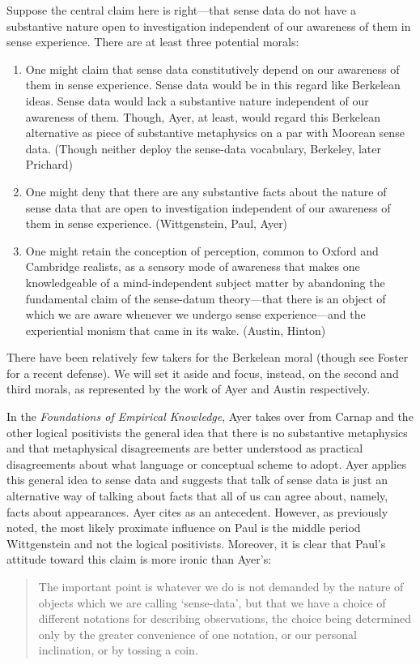 \documentclass[11pt]{article}
\begin{document}
Suppose the central claim here is right---that sense data do not have a substantive nature open to investigation independent of our awareness of them in sense experience. There are at least three potential morals:

\begin{enumerate}
	\item One might claim that sense data constitutively depend on our awareness of them in sense experience. Sense data would be in this regard like Berkelean ideas. Sense data would lack a substantive nature independent of our awareness of them. Though, Ayer, at least, would regard this Berkelean alternative as piece of substantive metaphysics on a par with Moorean sense data. (Though neither deploy the sense-data vocabulary, Berkeley, later Prichard)
	\item One might deny that there are any substantive facts about the nature of sense data that are open to investigation independent of our awareness of them in sense experience. (Wittgenstein, Paul, Ayer)
	\item One might retain the conception of perception, common to Oxford and Cambridge realists, as a sensory mode of awareness that makes one knowledgeable of a mind-independent subject matter by abandoning the fundamental claim of the sense-datum theory---that there is an object of which we are aware whenever we undergo sense experience---and the experiential monism that came in its wake. (Austin, Hinton)
\end{enumerate}

There have been relatively few takers for the Berkelean moral (though see Foster \citeyear{Foster:00ny} for a recent defense). We will set it aside and focus, instead, on the second and third morals, as represented by the work of Ayer and Austin respectively.

In the \emph{Foundations of Empirical Knowledge}, Ayer takes over from Carnap and the other logical positivists the general idea that there is no substantive metaphysics and that metaphysical disagreements are better understood as practical disagreements about what language or conceptual scheme to adopt. Ayer applies this general idea to sense data and suggests that talk of sense data is just an alternative way of talking about facts that all of us can agree about, namely, facts about appearances. Ayer cites \citet{Paul:1936kd} as an antecedent. However, as previously noted, the most likely proximate influence on Paul is the middle period Wittgenstein and not the logical positivists. Moreover, it is clear that Paul's attitude toward this claim is more ironic than Ayer's:
\begin{quote}
    The important point is whatever we do is not demanded by the nature of objects which we are calling `sense-data', but that we have a choice of different notations for describing observations, the choice being determined only by the greater convenience of one notation, or our personal inclination, or by tossing a coin. \citep[74]{Paul:1936kd}
\end{quote}
\end{document}
